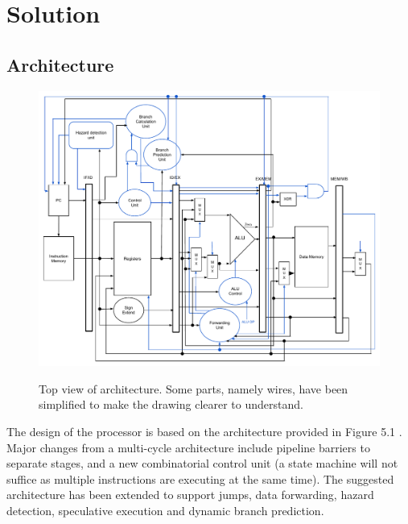 \chapter{Solution}


\section{Architecture}

\begin{figure}[ht!]
    \begin{center}
        \includegraphics[width=\textwidth]{assets/RTL.pdf}
        \label{fig:architecture}
        \caption{Top view of architecture. Some parts, namely wires,
                 have been simplified to make the drawing clearer to understand.}
    \end{center}
\end{figure}

The design of the processor is based on the architecture provided in Figure 5.1 \cite[p. 50]{compendium}.
Major changes from a multi-cycle architecture include pipeline barriers to separate stages,
and a new combinatorial control unit (a state machine will not suffice as multiple instructions are executing at the same time).
The suggested architecture has been extended to support jumps, data forwarding, hazard detection, speculative execution and dynamic branch prediction.

